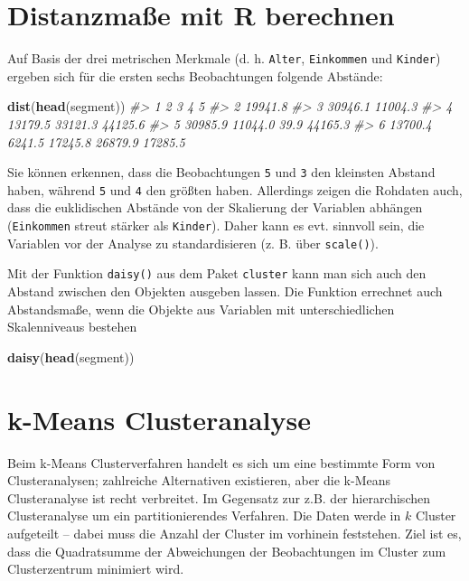 \documentclass[12pt,ngerman,]{book}
\makeatletter
\newenvironment{Shaded}{\begin{snugshade}}{\end{snugshade}}
\newcommand{\KeywordTok}[1]{\textcolor[rgb]{0.13,0.29,0.53}{\textbf{{#1}}}}
\newcommand{\CommentTok}[1]{\textcolor[rgb]{0.56,0.35,0.01}{\textit{{#1}}}}
\newcommand{\NormalTok}[1]{{#1}}
\newenvironment{kframe}{%
\medskip{}
\setlength{\fboxsep}{.8em}
 \def\at@end@of@kframe{}%
 \ifinner\ifhmode%
  \def\at@end@of@kframe{\end{minipage}}%
  \begin{minipage}{\columnwidth}%
 \fi\fi%
 \def\FrameCommand##1{\hskip\@totalleftmargin \hskip-\fboxsep
 \colorbox{shadecolor}{##1}\hskip-\fboxsep
     \hskip-\linewidth \hskip-\@totalleftmargin \hskip\columnwidth}%
 \MakeFramed {\advance\hsize-\width
   \@totalleftmargin\z@ \linewidth\hsize
   \@setminipage}}%
 {\par\unskip\endMakeFramed%
 \at@end@of@kframe}
\renewenvironment{Shaded}{\begin{kframe}}{\end{kframe}}
\theoremstyle{definition}
\theoremstyle{definition}
\theoremstyle{remark}
\makeatother
\begin{document}
\section{Distanzmaße mit R berechnen}\label{distanzmae-mit-r-berechnen}

Auf Basis der drei metrischen Merkmale (d. h. \texttt{Alter},
\texttt{Einkommen} und \texttt{Kinder}) ergeben sich für die ersten
sechs Beobachtungen folgende Abstände:

\begin{Shaded}
\begin{Highlighting}[]
\KeywordTok{dist}\NormalTok{(}\KeywordTok{head}\NormalTok{(segment))}
\CommentTok{#>         1       2       3       4       5}
\CommentTok{#> 2 19941.8                                }
\CommentTok{#> 3 30946.1 11004.3                        }
\CommentTok{#> 4 13179.5 33121.3 44125.6                }
\CommentTok{#> 5 30985.9 11044.0    39.9 44165.3        }
\CommentTok{#> 6 13700.4  6241.5 17245.8 26879.9 17285.5}
\end{Highlighting}
\end{Shaded}

Sie können erkennen, dass die Beobachtungen \texttt{5} und \texttt{3}
den kleinsten Abstand haben, während \texttt{5} und \texttt{4} den
größten haben. Allerdings zeigen die Rohdaten auch, dass die
euklidischen Abstände von der Skalierung der Variablen abhängen
(\texttt{Einkommen} streut stärker als \texttt{Kinder}). Daher kann es
evt. sinnvoll sein, die Variablen vor der Analyse zu standardisieren (z.
B. über \texttt{scale()}).

Mit der Funktion \texttt{daisy()} aus dem Paket \texttt{cluster} kann
man sich auch den Abstand zwischen den Objekten ausgeben lassen. Die
Funktion errechnet auch Abstandsmaße, wenn die Objekte aus Variablen mit
unterschiedlichen Skalenniveaus bestehen

\begin{Shaded}
\begin{Highlighting}[]
\KeywordTok{daisy}\NormalTok{(}\KeywordTok{head}\NormalTok{(segment))}
\end{Highlighting}
\end{Shaded}

\section{k-Means Clusteranalyse}\label{k-means-clusteranalyse}

Beim k-Means Clusterverfahren handelt es sich um eine bestimmte Form von
Clusteranalysen; zahlreiche Alternativen existieren, aber die k-Means
Clusteranalyse ist recht verbreitet. Im Gegensatz zur z.B. der
hierarchischen Clusteranalyse um ein partitionierendes Verfahren. Die
Daten werde in \(k\) Cluster aufgeteilt -- dabei muss die Anzahl der
Cluster im vorhinein feststehen. Ziel ist es, dass die Quadratsumme der
Abweichungen der Beobachtungen im Cluster zum Clusterzentrum minimiert
wird.
\end{document}
